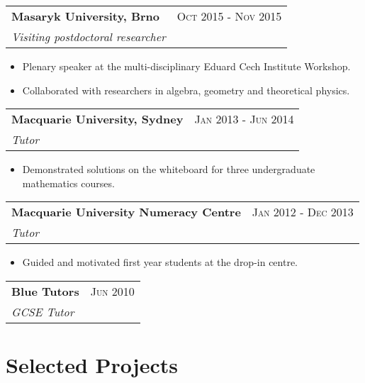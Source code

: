 \documentclass[a4paper,10pt]{article}
\begin{document}
\begin{tabu}{X[1, l]X[1 r]}
{\bf Masaryk University, Brno}&\textsc{Oct 2015 - Nov 2015}\\
\emph{Visiting postdoctoral researcher}  
\end{tabu}
\begin{itemize}
	\item Plenary speaker at the multi-disciplinary Eduard Cech Institute Workshop.
	\item Collaborated with researchers in algebra, geometry and theoretical physics.
\end{itemize}

\begin{tabu}{X[1, l]X[1 r]}
{\bf Macquarie University, Sydney}&\textsc{Jan 2013 - Jun 2014}\\
\emph{Tutor}
\end{tabu}
\begin{itemize}
  	\item Demonstrated solutions on the whiteboard for three undergraduate mathematics courses.
\end{itemize}  

\begin{tabu}{X[1, l]X[1 r]}
{\bf Macquarie University Numeracy Centre}&\textsc{Jan 2012 - Dec 2013}\\
\emph{Tutor}
\end{tabu}
\begin{itemize}
  	\item Guided and motivated first year students at the drop-in centre.
\end{itemize}

\begin{tabu}{X[1, l]X[1 r]}
{\bf Blue Tutors}&\textsc{Jun 2010}\\
\emph{GCSE Tutor}
\end{tabu}

\section{Selected Projects}
\end{document}
